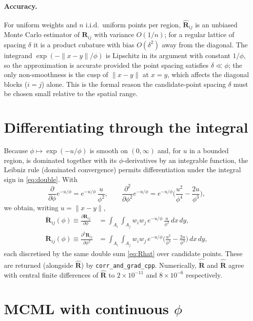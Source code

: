 \documentclass[11pt]{article}
\newcommand{\R}{\mathbf{R}}
\newcommand{\Rp}{\dot{\mathbf{R}}}
\newcommand{\Rpp}{\ddot{\mathbf{R}}}
\newcommand{\Ai}{A_i}
\newcommand{\Aj}{A_j}
\begin{document}
\paragraph{Accuracy.} For uniform weights and $n$ i.i.d.\ uniform points per
region, $\widehat{\R}_{ij}$ is an unbiased Monte Carlo estimator of $\R_{ij}$ with
variance $O(1/n)$; for a regular lattice of spacing $\delta$ it is a product
cubature with bias $O(\delta^2)$ away from the diagonal. The integrand
$\exp(-\|x-y\|/\phi)$ is Lipschitz in its argument with constant $1/\phi$, so the
approximation is accurate provided the point spacing satisfies $\delta \ll \phi$;
the only non-smoothness is the cusp of $\|x-y\|$ at $x=y$, which affects the
diagonal blocks ($i=j$) alone. This is the formal reason the candidate-point
spacing $\delta$ must be chosen small relative to the spatial range.

\section{Differentiating through the integral}

Because $\phi\mapsto \exp(-u/\phi)$ is smooth on $(0,\infty)$ and, for $u$ in a
bounded region, is dominated together with its $\phi$-derivatives by an integrable
function, the Leibniz rule (dominated convergence) permits differentiation under
the integral sign in \eqref{eq:double}. With
\[
\frac{\partial}{\partial\phi}e^{-u/\phi}=e^{-u/\phi}\,\frac{u}{\phi^2},
\qquad
\frac{\partial^2}{\partial\phi^2}e^{-u/\phi}
   =e^{-u/\phi}\Big(\frac{u^2}{\phi^4}-\frac{2u}{\phi^3}\Big),
\]
we obtain, writing $u=\|x-y\|$,
\begin{align}
\Rp_{ij}(\phi)\equiv\frac{\partial \R_{ij}}{\partial\phi}
&= \int_{\Ai}\!\int_{\Aj} w_i w_j\, e^{-u/\phi}\,\frac{u}{\phi^2}\,dx\,dy,
\label{eq:dR}\\[2pt]
\Rpp_{ij}(\phi)\equiv\frac{\partial^2 \R_{ij}}{\partial\phi^2}
&= \int_{\Ai}\!\int_{\Aj} w_i w_j\, e^{-u/\phi}
   \Big(\frac{u^2}{\phi^4}-\frac{2u}{\phi^3}\Big)\,dx\,dy,
\label{eq:d2R}
\end{align}
each discretised by the same double sum \eqref{eq:Rhat} over candidate points.
These are returned (alongside $\widehat{\R}$) by \texttt{corr\_and\_grad\_cpp}.
Numerically, $\widehat{\Rp}$ and $\widehat{\Rpp}$ agree with central finite
differences of $\widehat{\R}$ to $2\times10^{-11}$ and $8\times10^{-6}$
respectively.

\section{MCML with continuous $\phi$}
\end{document}
